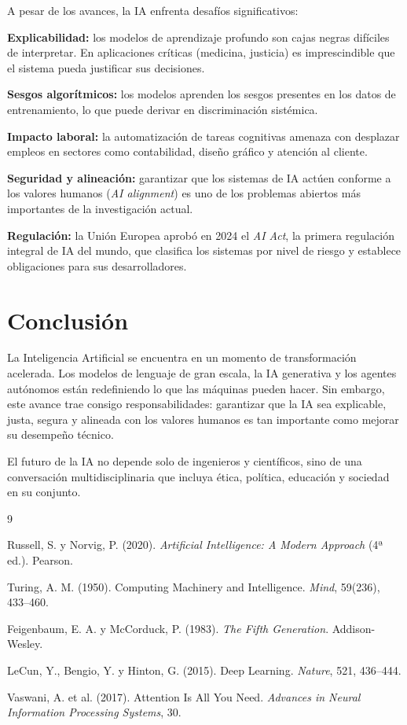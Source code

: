 \documentclass[12pt, a4paper]{article}
\begin{document}
A pesar de los avances, la IA enfrenta desafíos significativos:

\textbf{Explicabilidad:} los modelos de aprendizaje profundo son cajas negras difíciles de interpretar. En aplicaciones críticas (medicina, justicia) es imprescindible que el sistema pueda justificar sus decisiones.

\textbf{Sesgos algorítmicos:} los modelos aprenden los sesgos presentes en los datos de entrenamiento, lo que puede derivar en discriminación sistémica.

\textbf{Impacto laboral:} la automatización de tareas cognitivas amenaza con desplazar empleos en sectores como contabilidad, diseño gráfico y atención al cliente.

\textbf{Seguridad y alineación:} garantizar que los sistemas de IA actúen conforme a los valores humanos (\textit{AI alignment}) es uno de los problemas abiertos más importantes de la investigación actual.

\textbf{Regulación:} la Unión Europea aprobó en 2024 el \textit{AI Act}, la primera regulación integral de IA del mundo, que clasifica los sistemas por nivel de riesgo y establece obligaciones para sus desarrolladores.

\section{Conclusión}

La Inteligencia Artificial se encuentra en un momento de transformación acelerada. Los modelos de lenguaje de gran escala, la IA generativa y los agentes autónomos están redefiniendo lo que las máquinas pueden hacer. Sin embargo, este avance trae consigo responsabilidades: garantizar que la IA sea explicable, justa, segura y alineada con los valores humanos es tan importante como mejorar su desempeño técnico.

El futuro de la IA no depende solo de ingenieros y científicos, sino de una conversación multidisciplinaria que incluya ética, política, educación y sociedad en su conjunto.

\begin{thebibliography}{9}

Russell, S. y Norvig, P. (2020). \textit{Artificial Intelligence: A Modern Approach} (4ª ed.). Pearson.

Turing, A. M. (1950). Computing Machinery and Intelligence. \textit{Mind}, 59(236), 433–460.

Feigenbaum, E. A. y McCorduck, P. (1983). \textit{The Fifth Generation}. Addison-Wesley.

LeCun, Y., Bengio, Y. y Hinton, G. (2015). Deep Learning. \textit{Nature}, 521, 436–444.

Vaswani, A. et al. (2017). Attention Is All You Need. \textit{Advances in Neural Information Processing Systems}, 30.

\end{thebibliography}
\end{document}
